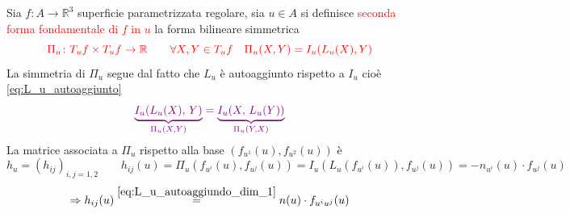         \newpage
        \begin{definizione}
        Sia $f \colon A \to \mathbb{R}^3$ superficie parametrizzata regolare, sia $u \in A$ si definisce 
        \textcolor{red}{seconda forma fondamentale di $f$ in $u$} la forma bilineare simmetrica
        \[ \color{red} \Pi_u \colon T_u f \times T_u f \to \mathbb{R} \qquad \forall X,Y \in T_u f \quad \Pi_u(X,Y) = I_u(L_u(X), Y) \]
        \textcolor{blu}{La simmetria di $\Pi_u$ segue dal fatto che $L_u$ è autoaggiunto rispetto a $I_u$ cioè \eqref{eq:L_u_autoaggiunto}}
        \[ \textcolor{violet}{\underbrace{I_u(L_u(X), \, Y)}_{\Pi_u(X,Y)} = \underbrace{I_u(X, \, L_u(Y))}_{\Pi_u(Y,X)} } \]
        La matrice associata a $\Pi_u$ rispetto alla base $\left(f_{u^1} (u), f_{u^2} (u)\right)$ è 
        \[  h_u = \left(h_{ij}\right)_{i,j=1,2} \qquad h_{ij} (u) = \Pi_u(f_{u^i}(u), f_{u^j}(u)) = I_u(L_u(f_{u^i}(u)), f_{u^j}(u)) = - n_{u^i}(u) \cdot f_{u^j} (u) \]
        \begin{equation}
        \Rightarrow h_{ij}(u) \overset{\eqref{eq:L_u_autoaggiundo_dim_1}}{=} n(u) \cdot f_{u^i u^j}(u)
        \end{equation}
        \end{definizione}
